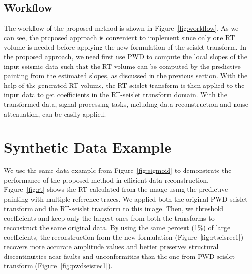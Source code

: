 
\subsection{Workflow}
    The workflow of the proposed method is shown in Figure~\ref{fig:workflow}. 
    As we can see, the proposed approach is convenient to implement since only 
    one RT volume is needed before applying the new formulation of the seislet 
    transform. 
    In the proposed approach, we need first use PWD to compute the local slopes 
    of the input seismic data such that the RT volume can be computed by the 
    predictive painting from the estimated slopes, as discussed in the previous 
    section. 
    With the help of the generated RT volume, the RT-seislet transform is then 
    applied to the input data to get coefficients in the RT-seislet transform 
    domain. 
    With the transformed data, signal processing tasks, including data 
    reconstruction and noise attenuation, can be easily applied.


\section{Synthetic Data Example}
    We use the same data example from Figure~\ref{fig:sigmoid} to demonstrate 
    the performance of the proposed method in ef{}ficient data reconstruction. 
    Figure~\ref{fig:rt} shows the RT calculated from the image using the 
    predictive painting with multiple reference traces. 
    We applied both the original PWD-seislet transform and the RT-seislet 
    transform to this image. 
    Then, we threshold coefficients and keep only the largest ones from both the 
    transforms to reconstruct the same original data. 
    By using the same percent (1\%) of large coefficients, the reconstruction 
    from the new formulation (Figure~\ref{fig:rtseisrec1}) recovers more 
    accurate amplitude values and better preserves structural discontinuities 
    near faults and unconformities than the one from PWD-seislet transform 
    (Figure~\ref{fig:pwdseisrec1}).
    
